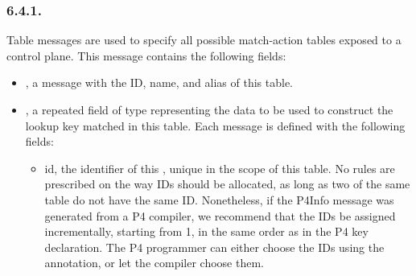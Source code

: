 \documentclass[11pt]{article}
\begin{document}
{%
\subsubsection{6.4.1.\hspace*{0.5em}}\label{sec-table}%

\noindent{}Table messages are used to specify all possible match-action tables exposed to a
control plane. This message contains the following fields:%

\begin{itemize}%

\item{}
, a  message with the ID, name, and alias of this table.%

\item{}
, a repeated field of type  representing the data to
be used to construct the lookup key matched in this table. Each 
message is defined with the following fields:%

\begin{itemize}%

\item{}
id, the  identifier of this , unique in the scope of
this table. No rules are prescribed on the way  IDs should be
allocated, as long as two  of the same table do not have the
same ID. Nonetheless, if the P4Info message was generated from a P4
compiler, we recommend that the IDs be assigned incrementally, starting
from 1, in the same order as in the P4 key declaration. The P4 programmer
can either choose the IDs using the  annotation, or let the compiler
choose them.%


\end{itemize}
\end{itemize}}
\end{document}
